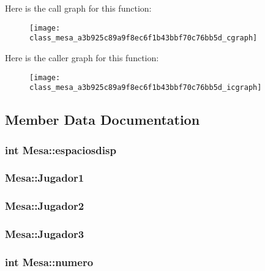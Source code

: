 Here is the call graph for this function\+:
\nopagebreak
\begin{figure}[H]
\begin{center}
\leavevmode
\texttt{[image: class\_mesa\_a3b925c89a9f8ec6f1b43bbf70c76bb5d\_cgraph]}
\end{center}
\end{figure}




Here is the caller graph for this function\+:
\nopagebreak
\begin{figure}[H]
\begin{center}
\leavevmode
\texttt{[image: class\_mesa\_a3b925c89a9f8ec6f1b43bbf70c76bb5d\_icgraph]}
\end{center}
\end{figure}




\subsection{Member Data Documentation}
\hypertarget{class_mesa_ab5d554a7073ea0a71f19bb796f43ec83}{
\subsubsection[{espaciosdisp}]{\setlength{\rightskip}{0pt plus 5cm}int Mesa\+::espaciosdisp}}\label{class_mesa_ab5d554a7073ea0a71f19bb796f43ec83}
\hypertarget{class_mesa_a31db9c4417611b8e6eb2b8695174775d}{
\subsubsection[{Jugador1}]{ Mesa\+::\+Jugador1}}\label{class_mesa_a31db9c4417611b8e6eb2b8695174775d}
\hypertarget{class_mesa_af43fd0e2946bb98c12551a83bff12885}{
\subsubsection[{Jugador2}]{ Mesa\+::\+Jugador2}}\label{class_mesa_af43fd0e2946bb98c12551a83bff12885}
\hypertarget{class_mesa_a522e14a1213755c443bd3e00da072a11}{
\subsubsection[{Jugador3}]{ Mesa\+::\+Jugador3}}\label{class_mesa_a522e14a1213755c443bd3e00da072a11}
\hypertarget{class_mesa_a704a565a0ac29cb726bb1a4e826a8127}{
\subsubsection[{numero}]{\setlength{\rightskip}{0pt plus 5cm}int Mesa\+::numero}}\label{class_mesa_a704a565a0ac29cb726bb1a4e826a8127}


